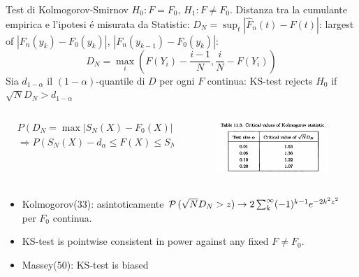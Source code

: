 \documentclass[asd-beamer.tex]{subfiles}
\begin{document}
\begin{frame}{Test di Kolmogorov-Smirnov}
$H_0: F=F_0$, $H_1: F\neq F_0$. Distanza tra la cumulante empirica e l'ipotesi \'e misurata da Statistic: $D_N=\sup_t{|\hat{F}_n(t)-F(t)|}$: largest of $|F_n(y_k)-F_0(y_k)|$, $|F_n(y_{k-1})-F_0(y_k)|$:
\[D_N=\max_{i}(F(Y_i)-\frac{i-1}{N},\frac{i}{N}-F(Y_i))\]
Sia $d_{1-\alpha}$ il $(1-\alpha)$-quantile di $D$ per ogni $F$ continua: KS-test rejects $H_0$ if $\sqrt{N}D_N>d_{1-\alpha}$
\begin{columns}[T]
\begin{column}{0.7\textwidth}
\begin{align*}
&P(D_N=\max|S_N(X)-F_0(X)|>d_{\alpha})=1-\alpha\\
&\Rightarrow P(S_N(X)-d_{\alpha}\leq F(X)\leq S_N(X)+d_{\alpha})=1-\alpha
\end{align*}
\end{column}
\begin{column}{0.3\textwidth}
\begin{figure}[!ht]\includegraphics[trim={0cm 0cm 0 0},clip, keepaspectratio,width=0.99\textwidth]{figures/james/test/gof-kolmogo-critical}\label{fig:gof-kolmogo-critical}
	\end{figure}
\end{column}
\end{columns}
\begin{itemize}
\item Kolmogorov(33): asintoticamente 
$\operatorname{\mathcal{P}}{(\sqrt{N}D_N>z)}\to2\sum_k^{\infty}(-1)^{k-1}e^{-2k^2z^2}$ per $F_0$ continua.
\item KS-test is pointwise consistent in power against any fixed $F\neq F_0$. %
\item Massey(50): KS-test is biased
\end{itemize}
\end{frame}
\end{document}
